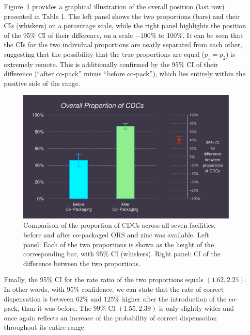 \documentclass[a4paper, 12pt]{article}
\begin{document}
Figure~\ref{Fig_Overall_Proportions} provides a graphical illustration of the overall position (last row) presented in Table 1.
The left panel shows the two proportions (bars) and their CIs (whiskers) on a percentage scale, while the right panel highlights the position of the 95\% CI of their difference, on a scale $-100$\% to 100\%.
It can be seen that the CIs for the two individual proportions are neatly separated from each other, suggesting that the possibility that the true proportions are equal ($p_1=p_2$) is extremely remote. This is additionally confirmed by the 95\% CI of their difference (``after co-pack'' minus ``before co-pack''), which lies entirely within the positive side of the range.


\begin{figure}
\includegraphics[width=\textwidth]{Overall_Difference_Proportions}
\caption{Comparison of the proportion of CDCs across all seven facilities, before and after co-packaged ORS and zinc was available. 
Left panel: Each of the two proportions is shown as the height of the corresponding bar, with 95\% CI (whiskers). Right panel: CI of the difference between the two proportions.}
\label{Fig_Overall_Proportions}
\end{figure}

Finally, the 95\% CI for the rate ratio of the two proportions equals $(1.62, 2.25)$. 
In other words, with 95\% confidence, we can state that
the rate of correct dispensation is between $62\%$ and $125\%$ higher after the introduction of the co-pack, than it was before.
The 99\% CI $(1.55, 2.39)$ is only slightly wider and once again reflects an increase of the
probability of correct dispensation throughout its entire range.


\end{document}
